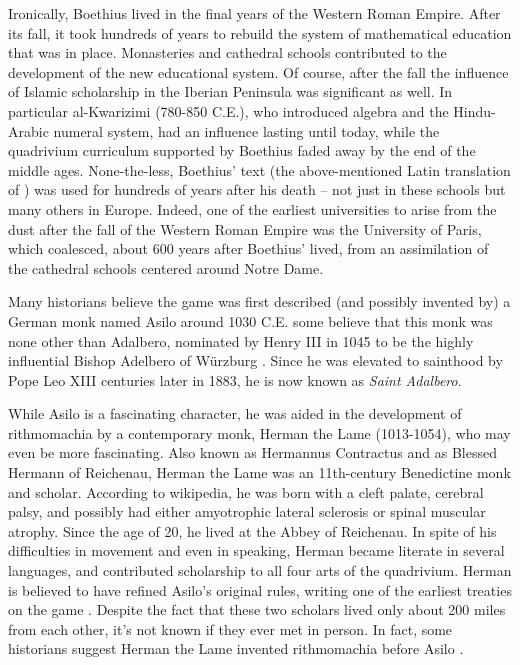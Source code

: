 \documentclass[12pt]{article}
\begin{document}
Ironically, Boethius lived in the final years of the Western Roman Empire.
After its fall, it took hundreds of years to rebuild the
system of mathematical education that was in place.
Monasteries and cathedral schools contributed to the
development of the new educational
system. Of course, after the fall the influence of Islamic scholarship
in the Iberian Peninsula was significant as well. In particular
al-Kwarizimi (780-850 C.E.), who introduced algebra and the Hindu-Arabic
numeral system, had an influence lasting until today,
while the quadrivium curriculum supported by Boethius faded away
by the end of the middle ages.
None-the-less, Boethius' text (the above-mentioned Latin
translation of \cite{Ni00})
was used for hundreds of years after his death -- not just in these
schools but many others in Europe.
Indeed, one of the earliest universities to arise from the dust after the
fall of the Western Roman Empire was the University of Paris, which
coalesced, about 600 years after Boethius' lived,
from an assimilation of the cathedral schools centered around
Notre Dame. 

Many historians believe the game was first described
(and possibly invented by) a German monk named
Asilo around 1030 C.E.
some believe that this monk was none other than Adalbero,
nominated by Henry III in 1045 to be the highly influential
Bishop Adelbero of W\"urzburg \cite{Mo01}.
Since he was elevated to sainthood by Pope Leo XIII
centuries later in 1883, he is now known as {\it Saint Adalbero}.

While Asilo is a fascinating character, he was aided in the
development of rithmomachia by a contemporary monk,
Herman the Lame (1013-1054),
who may even be more fascinating. Also known as
Hermannus Contractus and as Blessed Hermann of Reichenau,
Herman the Lame was an 11th-century Benedictine monk and scholar. 
According to wikipedia, he was born with a cleft palate, cerebral palsy, and
possibly had either amyotrophic lateral sclerosis or spinal
muscular atrophy. Since the age of 20, he lived at the
Abbey of Reichenau. In spite of his difficulties in movement
and even in speaking, Herman became literate in several languages,
and contributed scholarship to all four arts of the quadrivium.
Herman is believed to have refined Asilo's original rules,
writing one of the earliest treaties on the game
\cite{MacT}. Despite the fact that these two scholars lived only
about 200 miles from each other, it's not known if they ever met in person.
In fact, some historians suggest Herman the Lame invented rithmomachia
before Asilo \cite{SE11}.
\end{document}
